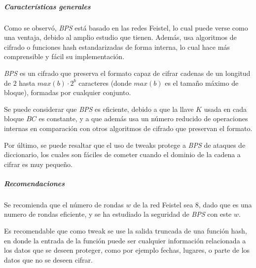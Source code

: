 
\subparagraph{Características generales}

Como se observó, \textit{BPS} está basado en las redes Feistel, lo cual puede 
verse como una ventaja, debido al amplio estudio que tienen. Además, usa 
algoritmos de cifrado o funciones hash estandarizadas de forma interna, lo 
cual hace más comprensible y fácil su implementación.

\textit{BPS} es un cifrado que preserva el formato capaz de cifrar cadenas de 
un longitud de $2$ hasta $max(b) \cdot 2^{b}$ caracteres (donde $max(b)$ es el 
tamaño máximo de bloque), formadas por cualquier conjunto.

Se puede considerar que \textit{BPS} es eficiente, debido a que la llave $K$ 
usada en cada bloque $BC$ es constante, y a que además usa un número reducido 
de operaciones internas en comparación con otros algoritmos de cifrado que 
preservan el formato.

Por último, se puede resaltar que el uso de tweaks protege a \textit{BPS} de 
ataques de diccionario, los cuales son fáciles de cometer cuando el dominio 
de la cadena a cifrar es muy pequeño.


\subparagraph{Recomendaciones}

Se recomienda que el número de rondas $w$ de la red Feistel sea $8$, dado 
que es una numero de rondas eficiente, y se ha estudiado la seguridad de 
\textit{BPS} con este $w$.

Es recomendable que como tweak se use la salida truncada de una función hash,
en donde la entrada de la función puede ser cualquier información relacionada 
a los datos que se deseen proteger, como por ejemplo fechas, lugares, o parte 
de los datos que no se deseen cifrar.


